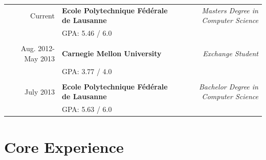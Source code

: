 \documentclass[a4paper,11pt]{article} %
\begin{document}
\begin{tabularx}{\textwidth}{r X r} 	
Current & 
\textbf{Ecole Polytechnique Fédérale de Lausanne} & 
\textit{Masters Degree in Computer Science}\\
&\footnotesize \textsc{GPA}: 5.46 / 6.0\\
\\

Aug. 2012-May 2013 & 
\textbf{Carnegie Mellon University} &
\textit{Exchange Student}\\
&\footnotesize \textsc{GPA}: 3.77 / 4.0\\
\\

July 2013 & 
\textbf{Ecole Polytechnique Fédérale de Lausanne} & 
\textit{Bachelor Degree in Computer Science}\\
&\footnotesize \textsc{GPA}: 5.63 / 6.0\\


\end{tabularx}


\section{Core Experience}
\end{document}
